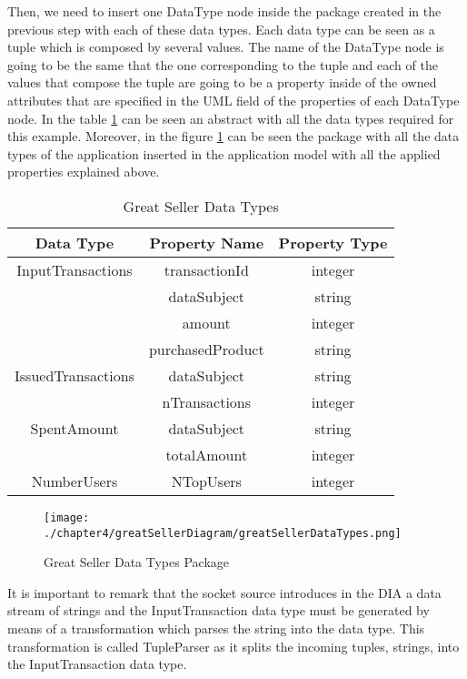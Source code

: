 Then, we need to insert one DataType node inside the package created in the previous step with each of these data types. Each data type can be seen as a tuple which is composed by several values. The name of the DataType node is going to be the same that the one corresponding to the tuple and each of the values that compose the tuple are going to be a property inside of the owned attributes that are specified in the UML field of the properties of each DataType node. In the table \ref{Great Seller Data Types} can be seen an abstract with all the data types required for this example. Moreover, in the figure \ref{fig:Great Seller Data Types Package} can be seen the package with all the data types of the application inserted in the application model with all the applied properties explained above.

\begin{table}[h!]
\centering
	\begin{tabular}{||c|c|c||} 
	\hline\hline
	Data Type & Property Name & Property Type \\ [1ex] 
	\hline\hline
	InputTransactions & transactionId & integer  \\
	& dataSubject & string  \\
	& amount & integer  \\
	& purchasedProduct & string  \\
	\hline
	IssuedTransactions & dataSubject & string  \\
	& nTransactions & integer \\
	\hline
	SpentAmount & dataSubject & string  \\
	& totalAmount & integer \\
	\hline
	NumberUsers & NTopUsers & integer  \\
	\hline\hline
	\end{tabular}
\caption{Great Seller Data Types}
\label{Great Seller Data Types}
\end{table}

\begin{figure}
\centering
{\texttt{[image: ./chapter4/greatSellerDiagram/greatSellerDataTypes.png]}}
\caption{Great Seller Data Types Package}
\label{fig:Great Seller Data Types Package}
\end{figure}

It is important to remark that the socket source introduces in the DIA a data stream of strings and the InputTransaction data type must be generated by means of a transformation which parses the string into the data type. This transformation is called TupleParser as it splits the incoming tuples, strings, into the InputTransaction data type.

